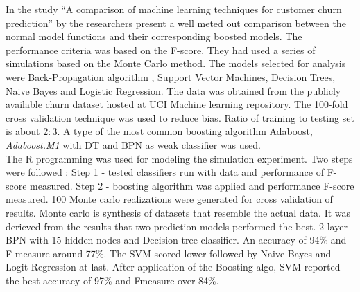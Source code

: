 In the study ``A comparison of machine learning techniques for customer churn prediction'' by  the researchers present a well meted out comparison between the normal model functions and their corresponding boosted models. The performance criteria was based on the F-score. They had used a series of simulations based on the Monte Carlo method. The models selected for analysis were Back-Propagation algorithm , Support Vector Machines, Decision Trees, Naive Bayes and Logistic Regression. The data was obtained from the publicly available churn dataset hosted at UCI Machine learning repository. The 100-fold cross validation technique was used to reduce bias. Ratio of training to testing set is about $2:3$. A type of the most common boosting algorithm Adaboost, \textit{Adaboost.M1} with DT and BPN as weak classifier was used.\\
The R programming was used for modeling the simulation experiment. Two steps were followed : Step 1 - tested classifiers run with data and performance of F-score measured. Step 2 - boosting algorithm was applied and performance F-score measured. 100 Monte carlo realizations were generated for cross validation of results. Monte carlo is synthesis of datasets that resemble the actual data. It was derieved from the results that two prediction models performed the best. 2 layer BPN with 15 hidden nodes and Decision tree classifier. An accuracy of 94\% and F-measure around 77\%. The SVM scored lower followed by Naive Bayes and Logit Regression at last. After application of the Boosting algo, SVM reported the best accuracy of 97\% and Fmeasure over 84\%.


